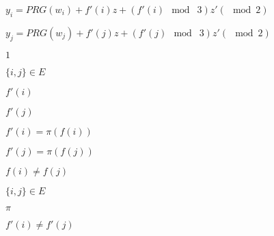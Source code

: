\documentclass[10pt]{book}
\begin{document}
\begin{mdSnippets}
\begin{mdInlineSnippet}[a3b48626cd7d9e0ddcecc07882e86e83]%
$y_i = PRG(w_i)+f'(i)z +(f'(i) \mod\; 3)z' (\mod 2)$\end{mdInlineSnippet}%
\begin{mdInlineSnippet}%
$y_j = PRG(w_j)+f'(j)z +(f'(j) \mod\; 3)z' (\mod 2)$\end{mdInlineSnippet}%
\begin{mdInlineSnippet}[c4ca4238a0b923820dcc509a6f75849b]%
$1$\end{mdInlineSnippet}%
\begin{mdInlineSnippet}[68952af2bc4f3aca429e11a9b4b1a939]%
$\{i,j\} \in E$\end{mdInlineSnippet}%
\begin{mdInlineSnippet}[91e325aa5502d2676a7d4884dcdd4904]%
$f'(i)$\end{mdInlineSnippet}%
\begin{mdInlineSnippet}[b2c06be92490d8023131a6da7de2d0c1]%
$f'(j)$\end{mdInlineSnippet}%
\begin{mdInlineSnippet}[b34ae0f67085d5c5d88579e1b5b42404]%
$f'(i) = \pi(f(i))$\end{mdInlineSnippet}%
\begin{mdInlineSnippet}%
$f'(j) = \pi(f(j))$\end{mdInlineSnippet}%
\begin{mdInlineSnippet}[efa924d5cf60d046012e7d74d23eb025]%
$f(i) \neq f(j)$\end{mdInlineSnippet}%
\begin{mdInlineSnippet}[68952af2bc4f3aca429e11a9b4b1a939]%
$\{i,j\} \in E$\end{mdInlineSnippet}%
\begin{mdInlineSnippet}%
$\pi$\end{mdInlineSnippet}%
\begin{mdInlineSnippet}[9dd1a335e938f1246ec9ad5d457b9ab1]%
$f'(i) \neq f'(j)$\end{mdInlineSnippet}%
\begin{mdInlineSnippet}[9d66b5380a1702859617b42a06f59053]%

\end{mdInlineSnippet}
\end{mdSnippets}
\end{document}
